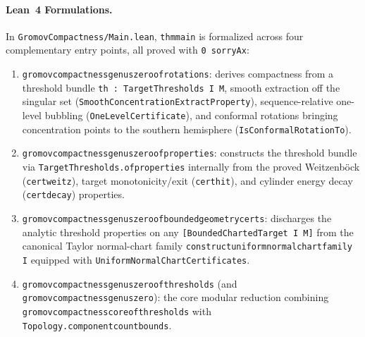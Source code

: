 \documentclass[10pt]{article}
\renewcommand{\_}{\origus\allowbreak}
\newcommand{\code}[1]{\texttt{#1}}
\begin{document}
\paragraph{Lean~4 Formulations.}
In \code{GromovCompactness/Main.lean}, \code{thm\_main} is formalized across four complementary
entry points, all proved with \code{0 sorryAx}:
\begin{enumerate}\sloppy
\item \code{gromov\_compactness\_genus\_zero\_of\_rotations}: derives compactness from a threshold
  bundle \code{th : TargetThresholds I M}, smooth extraction off the singular set
  (\code{SmoothConcentration\allowbreak ExtractProperty}), sequence-relative one-level bubbling
  (\code{OneLevelCertificate}), and conformal rotations bringing concentration points to the
  southern hemisphere (\code{IsConformalRotationTo}).
\item \code{gromov\_compactness\_genus\_zero\_of\_properties}: constructs the threshold bundle
  via \code{TargetThresholds.\allowbreak of\_properties} internally from the
  proved Weitzenb\"ock (\code{cert\_weitz}), target monotonicity/exit (\code{cert\_hit}), and
  cylinder energy decay (\code{cert\_decay}) properties.
\item \code{gromov\_compactness\_genus\_zero\_of\_bounded\_geometry\_certs}: discharges the analytic
  threshold properties on any \code{[BoundedChartedTarget I M]} from the canonical Taylor normal-chart
  family \code{construct\_uniform\_normal\_chart\_family I} equipped with
  \code{UniformNormalChartCertificates}.
\item \code{gromov\_compactness\_genus\_zero\_of\_thresholds} (and \code{gromov\_compactness\_genus\_zero}):
  the core modular reduction combining \code{gromov\_compactness\_core\_of\_thresholds} with
  \code{Topology.component\_count\_bounds}.
\end{enumerate}
\end{document}
